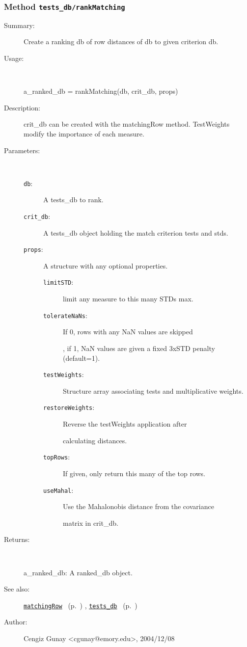 \subsubsection[Method \texttt{rankMatching}]{Method \texttt{tests\_db/rankMatching}}%
%
\label{ref_tests_db__rankMatching}%
\hypertarget{ref_tests_db__rankMatching}{}%
\begin{description}
\item[Summary:]Create a ranking db of row distances of db to given criterion db.
%
\item[Usage:]~%
\begin{lyxcode}%
a\_ranked\_db = rankMatching(db, crit\_db, props)
%
\end{lyxcode}%
%
\item[Description:]%
crit\_db can be created with the matchingRow method. TestWeights modify the importance 
 of each measure.
\item[Parameters:]~
\begin{description}%
\item[\texttt{db}:]
 A tests\_db to rank.
\item[\texttt{crit\_db}:]
 A tests\_db object holding the match criterion tests and stds.
\item[\texttt{props}:]
 A structure with any optional properties.
\begin{description}%
\item[\texttt{limitSTD}:]
 limit any measure to this many STDs max.
\item[\texttt{tolerateNaNs}:]
 If 0, rows with any NaN values are skipped

, if 1, NaN values are given a fixed 3xSTD penalty (default=1).\item[\texttt{testWeights}:]
 Structure array associating tests and multiplicative weights.
\item[\texttt{restoreWeights}:]
 Reverse the testWeights application after

calculating distances.\item[\texttt{topRows}:]
 If given, only return this many of the top rows.
\item[\texttt{useMahal}:]
 Use the Mahalonobis distance from the covariance

matrix in crit\_db.\end{description}%
\end{description}%
%
\item[Returns:]~

	a\_ranked\_db: A ranked\_db object.
%
%
\item[See also:]%
\hyperlink{ref_matchingRow}{\texttt{matchingRow}}%
\ (p.~\pageref{ref_matchingRow})%
%
, \hyperlink{ref_tests_db}{\texttt{tests\_db}}%
\ (p.~\pageref{ref_tests_db})%
%
%
\item[Author:]%
Cengiz Gunay <cgunay@emory.edu>, 2004/12/08%
\end{description}
\methodline%
